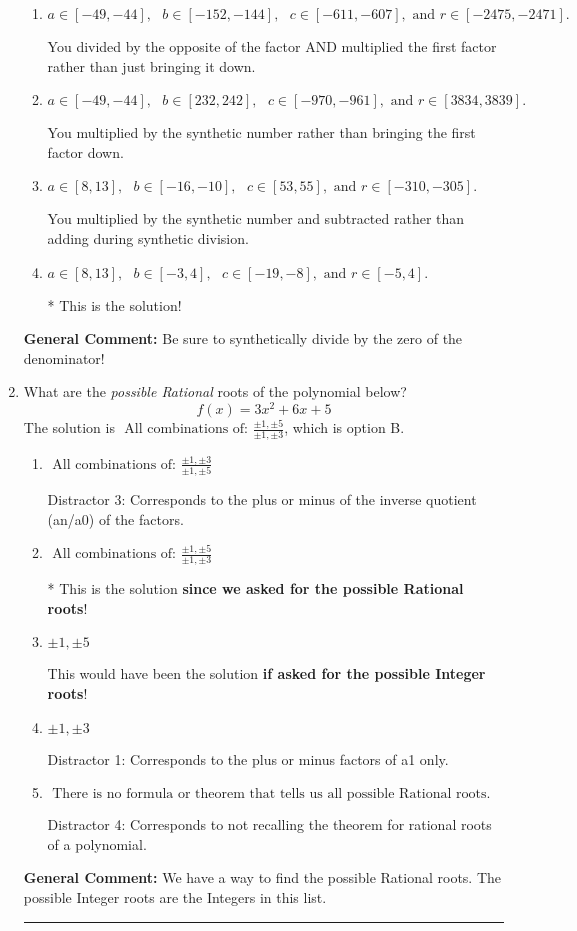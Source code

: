 \documentclass{extbook}[14pt]
\newcommand{\litem}[1]{\item #1

\rule{\textwidth}{0.4pt}}
\begin{document}
\begin{enumerate}
{\begin{enumerate}[label=\Alph*.]
 You divided by the opposite of the factor.
\item \( a \in [-49, -44], \text{   } b \in [-152, -144], \text{   } c \in [-611, -607], \text{   and   } r \in [-2475, -2471]. \)

 You divided by the opposite of the factor AND multiplied the first factor rather than just bringing it down.
\item \( a \in [-49, -44], \text{   } b \in [232, 242], \text{   } c \in [-970, -961], \text{   and   } r \in [3834, 3839]. \)

 You multiplied by the synthetic number rather than bringing the first factor down.
\item \( a \in [8, 13], \text{   } b \in [-16, -10], \text{   } c \in [53, 55], \text{   and   } r \in [-310, -305]. \)

 You multiplied by the synthetic number and subtracted rather than adding during synthetic division.
\item \( a \in [8, 13], \text{   } b \in [-3, 4], \text{   } c \in [-19, -8], \text{   and   } r \in [-5, 4]. \)

* This is the solution!
\end{enumerate}

\textbf{General Comment:} Be sure to synthetically divide by the zero of the denominator!
}
\litem{
What are the \textit{possible Rational} roots of the polynomial below?
\[ f(x) = 3x^{2} +6 x + 5 \]The solution is \( \text{ All combinations of: }\frac{\pm 1,\pm 5}{\pm 1,\pm 3} \), which is option B.\begin{enumerate}[label=\Alph*.]
\item \( \text{ All combinations of: }\frac{\pm 1,\pm 3}{\pm 1,\pm 5} \)

 Distractor 3: Corresponds to the plus or minus of the inverse quotient (an/a0) of the factors. 
\item \( \text{ All combinations of: }\frac{\pm 1,\pm 5}{\pm 1,\pm 3} \)

* This is the solution \textbf{since we asked for the possible Rational roots}!
\item \( \pm 1,\pm 5 \)

This would have been the solution \textbf{if asked for the possible Integer roots}!
\item \( \pm 1,\pm 3 \)

 Distractor 1: Corresponds to the plus or minus factors of a1 only.
\item \( \text{ There is no formula or theorem that tells us all possible Rational roots.} \)

 Distractor 4: Corresponds to not recalling the theorem for rational roots of a polynomial.
\end{enumerate}

\textbf{General Comment:} We have a way to find the possible Rational roots. The possible Integer roots are the Integers in this list.
}
\end{enumerate}
\end{document}
